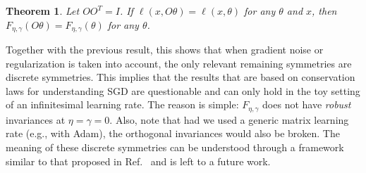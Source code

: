 \documentclass{article}
\theoremstyle{plain}
\newtheorem{theorem}{Theorem}
\newcommand{\E}{\mathbb{E}}
\begin{document}
\begin{theorem}
\label{theo:orthogonal}
Let $OO^T = I$. If $\ell(x, O\theta) = \ell(x,\theta)$ for any $\theta$ and $x$, then $F_{\eta,\gamma}(O\theta) = F_{\eta,\gamma}(\theta)$ for any $\theta$.
\end{theorem}

Together with the previous result, this shows that when gradient noise or regularization is taken into account, the only relevant remaining symmetries are discrete symmetries. This implies that the results that are based on conservation laws for understanding SGD are questionable and can only hold in the toy setting of an infinitesimal learning rate. The reason is simple: $F_{\eta, \gamma}$ does not have \textit{robust} invariances at $\eta=\gamma =0$. Also, note that had we used a generic matrix learning rate (e.g., with Adam), the orthogonal invariances would also be broken. The meaning of these discrete symmetries can be understood through a framework similar to that proposed in Ref.~\cite{ziyin2024symmetry} and is left to a future work.












\end{document}
